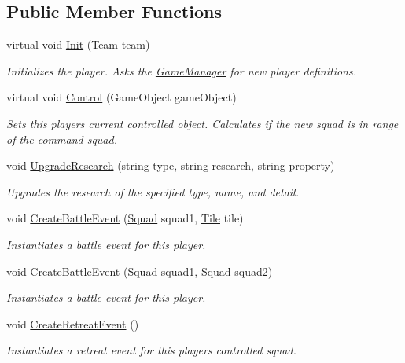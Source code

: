\subsection*{Public Member Functions}
\begin{DoxyCompactItemize}
\item 
virtual void \hyperlink{class_player_a080e71574a6955345c819bf76498a3b9}{Init} (Team team)
\begin{DoxyCompactList}\small\item\em Initializes the player. Asks the \hyperlink{class_game_manager}{Game\+Manager} for new player definitions. \end{DoxyCompactList}\item 
virtual void \hyperlink{class_player_a361fd63247679d1a993cbb8bf3efe412}{Control} (Game\+Object game\+Object)
\begin{DoxyCompactList}\small\item\em Sets this player\textquotesingle{}s current controlled object. Calculates if the new squad is in range of the command squad. \end{DoxyCompactList}\item 
void \hyperlink{class_player_a4819312f0a8c10f8e6c9cfbf3233adfa}{Upgrade\+Research} (string type, string research, string property)
\begin{DoxyCompactList}\small\item\em Upgrades the research of the specified type, name, and detail. \end{DoxyCompactList}\item 
void \hyperlink{class_player_aecd6ff3f38c968e910dd34416f49fd9c}{Create\+Battle\+Event} (\hyperlink{class_squad}{Squad} squad1, \hyperlink{class_tile}{Tile} tile)
\begin{DoxyCompactList}\small\item\em Instantiates a battle event for this player. \end{DoxyCompactList}\item 
void \hyperlink{class_player_a7661e192785c1722a820dc09cc5f5145}{Create\+Battle\+Event} (\hyperlink{class_squad}{Squad} squad1, \hyperlink{class_squad}{Squad} squad2)
\begin{DoxyCompactList}\small\item\em Instantiates a battle event for this player. \end{DoxyCompactList}\item 
void \hyperlink{class_player_ac8ec326ee52c5d405b9764ac3794f58b}{Create\+Retreat\+Event} ()
\begin{DoxyCompactList}\small\item\em Instantiates a retreat event for this player\textquotesingle{}s controlled squad. \end{DoxyCompactList}\item 

\end{DoxyCompactItemize}
